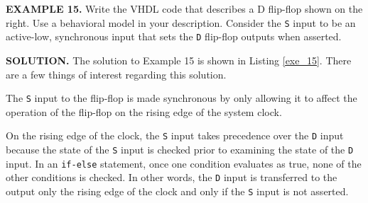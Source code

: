 \begin{leftbar}
\begin{minipage}{0.5\linewidth}
\noindent
\textbf{EXAMPLE 15.}
Write the VHDL code that describes a D flip-flop shown on the right. Use a behavioral model in your description. Consider the \texttt{S} input to be an active-low, synchronous input that sets the \texttt{D} flip-flop outputs when asserted.
\end{minipage}
\begin{minipage}{0.47\linewidth}
\begin{flushright}
\end{flushright}
\end{minipage}
\end{leftbar}
\noindent
\textbf{SOLUTION.} The solution to Example 15 is shown in Listing \ref{exe_15}. There are a few things of interest regarding this solution.
\begin{my_list}
\item The \texttt{S} input to the flip-flop is made synchronous by only allowing it to affect the operation of the flip-flop on the rising edge of the system clock. 
\item On the rising edge of the clock, the \texttt{S} input takes precedence over the \texttt{D} input because the state of the \texttt{S} input is checked prior to examining the state of the \texttt{D} input. In an \texttt{if-else} statement, once one condition evaluates as true, none of the other conditions is checked. In other words, the \texttt{D} input is transferred to the output only the rising edge of the clock and only if the \texttt{S} input is not asserted.
\end{my_list}


